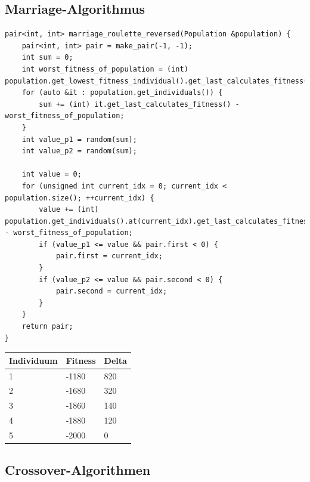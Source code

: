 \subsection{Marriage-Algorithmus}
\begin{minipage}{\linewidth}
\begin{lstlisting}[caption={Marriage-Roulette Algorithmus}, firstnumber=1, captionpos=b, label=lst:marriage]
pair<int, int> marriage_roulette_reversed(Population &population) {
	pair<int, int> pair = make_pair(-1, -1);
	int sum = 0;
	int worst_fitness_of_population = (int) population.get_lowest_fitness_individual().get_last_calculates_fitness();
	for (auto &it : population.get_individuals()) {
		sum += (int) it.get_last_calculates_fitness() - worst_fitness_of_population;
	}
	int value_p1 = random(sum);
	int value_p2 = random(sum);

	int value = 0;
	for (unsigned int current_idx = 0; current_idx < population.size(); ++current_idx) {
		value += (int) population.get_individuals().at(current_idx).get_last_calculates_fitness() - worst_fitness_of_population;
		if (value_p1 <= value && pair.first < 0) {
			pair.first = current_idx;
		}
		if (value_p2 <= value && pair.second < 0) {
			pair.second = current_idx;
		}
	}
	return pair;
}
\end{lstlisting}
\end{minipage}
\begin{center}
\begin{tabular}{|l|l|l|}
 Individuum & Fitness & Delta \\ 
\hline
 1 & -1180 & 820 \\  
 2 & -1680 & 320 \\  
 3 & -1860 & 140 \\  
 4 & -1880 & 120 \\  
 5 & -2000 & 0 \\  
\end{tabular}
\end{center}

\subsection{Crossover-Algorithmen}

